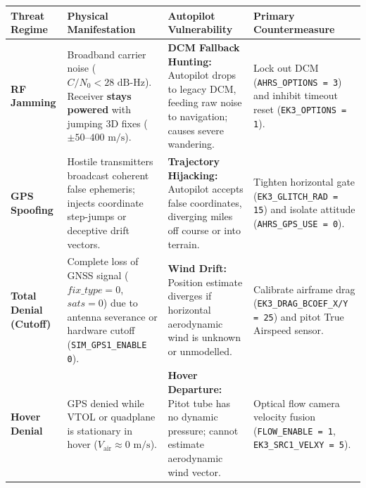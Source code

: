 \documentclass[10pt,letterpaper]{article}
\begin{document}
\vspace{1mm}
\noindent
\footnotesize
\renewcommand{\arraystretch}{1.18}
\begin{tabularx}{\textwidth}{L{0.18\textwidth} L{0.25\textwidth} L{0.27\textwidth} Y}
\toprule
{}
\textbf{Threat Regime} & \textbf{Physical Manifestation} & \textbf{Autopilot Vulnerability} & \textbf{Primary Countermeasure} \\
\midrule
\textbf{RF Jamming} & 
Broadband carrier noise ($C/N_0 < 28\text{ dB-Hz}$). Receiver \textbf{stays powered} with jumping 3D fixes ($\pm 50\text{--}400\text{ m/s}$). & 
\textbf{DCM Fallback Hunting:} Autopilot drops to legacy DCM, feeding raw noise to navigation; causes severe wandering. & 
Lock out DCM (\texttt{AHRS\_OPTIONS = 3}) and inhibit timeout reset (\texttt{EK3\_OPTIONS = 1}). \\
\textbf{GPS Spoofing} & 
Hostile transmitters broadcast coherent false ephemeris; injects coordinate step-jumps or deceptive drift vectors. & 
\textbf{Trajectory Hijacking:} Autopilot accepts false coordinates, diverging miles off course or into terrain. & 
Tighten horizontal gate (\texttt{EK3\_GLITCH\_RAD = 15}) and isolate attitude (\texttt{AHRS\_GPS\_USE = 0}). \\
\textbf{Total Denial (Cutoff)} & 
Complete loss of GNSS signal ($fix\_type = 0$, $sats = 0$) due to antenna severance or hardware cutoff (\texttt{SIM\_GPS1\_ENABLE 0}). & 
\textbf{Wind Drift:} Position estimate diverges if horizontal aerodynamic wind is unknown or unmodelled. & 
Calibrate airframe drag (\texttt{EK3\_DRAG\_BCOEF\_X/Y = 25}) and pitot True Airspeed sensor. \\
\textbf{Hover Denial} & 
GPS denied while VTOL or quadplane is stationary in hover ($V_{\text{air}} \approx 0\text{ m/s}$). & 
\textbf{Hover Departure:} Pitot tube has no dynamic pressure; cannot estimate aerodynamic wind vector. & 
Optical flow camera velocity fusion (\texttt{FLOW\_ENABLE = 1}, \texttt{EK3\_SRC1\_VELXY = 5}). \\
\bottomrule
\end{tabularx}

\vspace{3.5mm}
\end{document}
